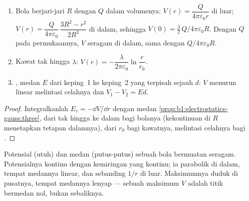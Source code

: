 \begin{proposition}\label{prop:b1:potential-capacitors:classic}
\begin{enumerate}
  \item Bola berjari-jari $R$ dengan $Q$ dalam volumenya: $V(r) = \dfrac{Q}{4\pi\varepsilon_0r}$
        di luar; $V(r) = \dfrac{Q}{4\pi\varepsilon_0}\,\dfrac{3R^2 - r^2}{2R^3}$
        di dalam, sehingga $V(0) = \tfrac32\,Q/4\pi\varepsilon_0R$. Dengan $Q$ pada permukaannya,
        $V$ seragam di dalam, sama dengan $Q/4\pi\varepsilon_0R$.
  \item Kawat tak hingga $\lambda$: $V(r) = -\dfrac{\lambda}{2\pi\varepsilon_0}\ln\dfrac{r}{r_0}$.
  \item {}, medan $E$ dari keping~1 ke keping~2 yang terpisah
        sejauh $d$: $V$ menurun linear melintasi celahnya dan $V_1 - V_2 = Ed$.
\end{enumerate}
\end{proposition}

\begin{proof}
Integralkanlah $E_r = -\dd V/\dd r$ dengan medan
\cref{prop:b1:electrostatics-gauss:three}, dari tak hingga ke dalam bagi
bolanya (kekontinuan di $R$ menetapkan tetapan dalamnya), dari $r_0$ bagi
kawatnya, melintasi celahnya bagi .
\end{proof}

\begin{omfigure}

{\small Potensial (utuh) dan medan (putus-putus) sebuah bola bermuatan
seragam. Potensialnya kontinu dengan kemiringan yang kontinu; ia
parabolik di dalam, tempat medannya linear, dan sebanding $1/r$ di luar.
Maksimumnya duduk di pusatnya, tempat medannya lenyap --- sebuah maksimum
$V$ adalah titik bermedan nol, bukan sebaliknya.}
\end{omfigure}

